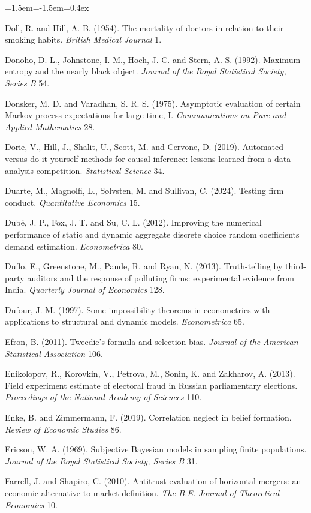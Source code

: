 \begin{list}{}{\leftmargin=1.5em\itemindent=-1.5em\itemsep=0.4ex}
\item Doll, R. and Hill, A. B. (1954). The mortality of doctors in relation to their smoking habits. \emph{British Medical Journal} 1.
\item Donoho, D. L., Johnstone, I. M., Hoch, J. C. and Stern, A. S. (1992). Maximum entropy and the nearly black object. \emph{Journal of the Royal Statistical Society, Series B} 54.
\item Donsker, M. D. and Varadhan, S. R. S. (1975). Asymptotic evaluation of certain Markov process expectations for large time, I. \emph{Communications on Pure and Applied Mathematics} 28.
\item Dorie, V., Hill, J., Shalit, U., Scott, M. and Cervone, D. (2019). Automated versus do it yourself methods for causal inference: lessons learned from a data analysis competition. \emph{Statistical Science} 34.
\item Duarte, M., Magnolfi, L., S{\o}lvsten, M. and Sullivan, C. (2024). Testing firm conduct. \emph{Quantitative Economics} 15.
\item Dub\'e, J. P., Fox, J. T. and Su, C. L. (2012). Improving the numerical performance of static and dynamic aggregate discrete choice random coefficients demand estimation. \emph{Econometrica} 80.
\item Duflo, E., Greenstone, M., Pande, R. and Ryan, N. (2013). Truth-telling by third-party auditors and the response of polluting firms: experimental evidence from India. \emph{Quarterly Journal of Economics} 128.
\item Dufour, J.-M. (1997). Some impossibility theorems in econometrics with applications to structural and dynamic models. \emph{Econometrica} 65.
\item Efron, B. (2011). Tweedie's formula and selection bias. \emph{Journal of the American Statistical Association} 106.
\item Enikolopov, R., Korovkin, V., Petrova, M., Sonin, K. and Zakharov, A. (2013). Field experiment estimate of electoral fraud in Russian parliamentary elections. \emph{Proceedings of the National Academy of Sciences} 110.
\item Enke, B. and Zimmermann, F. (2019). Correlation neglect in belief formation. \emph{Review of Economic Studies} 86.
\item Ericson, W. A. (1969). Subjective Bayesian models in sampling finite populations. \emph{Journal of the Royal Statistical Society, Series B} 31.
\item Farrell, J. and Shapiro, C. (2010). Antitrust evaluation of horizontal mergers: an economic alternative to market definition. \emph{The B.E. Journal of Theoretical Economics} 10.

\end{list}
